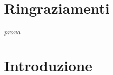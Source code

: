 \chapter*{Ringraziamenti} %
\begin{flushright}
\itshape 
prova
\end{flushright}


\chapter{Introduzione}